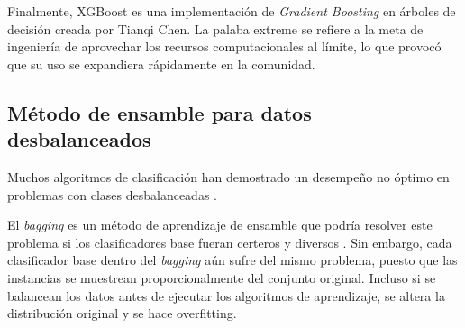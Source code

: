 Finalmente, XGBoost es una implementación de \textit{Gradient Boosting} en árboles de decisión creada por Tianqi Chen. La palaba extreme se refiere a la meta de ingeniería de aprovechar los recursos computacionales al límite, lo que provocó que su uso se expandiera rápidamente en la comunidad.



\subsection{Método de ensamble para datos desbalanceados}


Muchos algoritmos de clasificación han demostrado un desempeño no óptimo en problemas con clases desbalanceadas \citep{batista2004study, mani2003knn, seiffert2010rusboost}.

El \textit{bagging} es un método de aprendizaje de ensamble que podría resolver este problema si los clasificadores base fueran certeros y diversos \citep{breiman1996bagging}. Sin embargo, cada clasificador base dentro del \textit{bagging} aún sufre del mismo problema, puesto que las instancias se muestrean proporcionalmente del conjunto original. Incluso si se balancean los datos antes de ejecutar los algoritmos de aprendizaje, se altera la distribución original y se hace overfitting.

